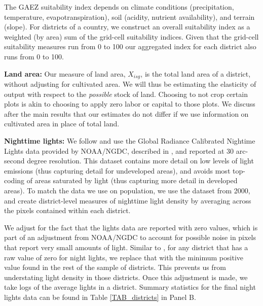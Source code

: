 \documentclass[12pt]{article}
\begin{document}
The GAEZ suitability index depends on climate conditions (precipitation, temperature, evapotranspiration), soil (acidity, nutrient availability), and terrain (slope). For districts of a country, we construct an overall suitability index as a weighted (by area) sum of the grid-cell suitability indices. Given that the grid-cell suitability measures run from 0 to 100  our aggregated index for each district also runs from 0 to 100.

\vspace{.5cm}\noindent\textbf{Land area:} Our measure of land area, $X_{isg}$, is the total land area of a district, without adjusting for cultivated area. We will thus be estimating the elasticity of output with respect to the \textit{possible} stock of land. Choosing to not crop certain plots is akin to choosing to apply zero labor or capital to those plots. We discuss after the main results that our estimates do not differ if we use information on cultivated area in place of total land.

\vspace{.5cm}\noindent\textbf{Nighttime lights:} We follow \citet{hssw2016} and use the Global Radiance Calibrated Nightime Lights data provided by NOAA/NGDC, described in \citet{Elvidge1999}, and reported at 30 arc-second degree resolution. This dataset contains more detail on low levels of light emissions (thus capturing detail for undeveloped areas), and avoids most top-coding of areas saturated by light (thus capturing more detail in developed areas). To match the data we use on population, we use the dataset from 2000, and create district-level measures of nighttime light density by averaging across the pixels contained within each district.

We adjust for the fact that the lights data are reported with zero values, which is part of an adjustment from NOAA/NGDC to account for possible noise in pixels that report very small amounts of light. Similar to \citet{hssw2016}, for any district that has a raw value of zero for night lights, we replace that with the minimum positive value found in the rest of the sample of districts. This prevents us from understating light density in those districts. Once this adjustment is made, we take logs of the average lights in a district. Summary statistics for the final night lights data can be found in Table \ref{TAB_districts} in Panel B.
\end{document}
